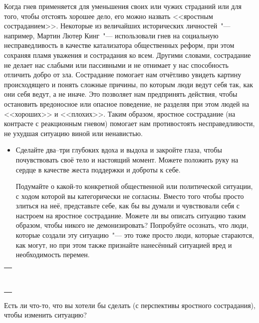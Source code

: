 Когда гнев применяется для уменьшения своих или чужих страданий или для того, чтобы отстоять хорошее дело, его можно назвать <<яростным состраданием>>. Некоторые из величайших исторических личностей~"--- например, Мартин Лютер Кинг~"--- использовали гнев на социальную несправедливость в качестве катализатора общественных реформ, при этом сохраняя пламя уважения и сострадания ко всем. Другими словами, сострадание не делает нас слабыми или пассивными и не отнимает у нас способность отличить добро от зла. Сострадание помогает нам отчётливо увидеть картину происходящего и понять сложные причины, по которым люди ведут себя так, как они себя ведут, а не иначе. Это позволяет нам предпринять действия, чтобы остановить вредоносное или опасное поведение, не разделяя при этом людей на <<хороших>> и <<плохих>>. Таким образом, яростное сострадание (на контрасте с реакционным гневом) помогает нам противостоять несправедливости, не ухудшая ситуацию виной или ненавистью.
\begin{itemize}
	\item Сделайте два--три глубоких вдоха и выдоха и закройте глаза, чтобы почувствовать своё тело и настоящий момент. Можете положить руку на сердце в качестве жеста поддержки и доброты к себе.
	
	\itemWritingHand Подумайте о какой-то конкретной общественной или политической ситуации, с ходом которой вы категорически не согласны. Вместо того чтобы просто злиться на неё, представьте себе, как бы вы думали и чувствовали себя с настроем на яростное сострадание. Можете ли вы описать ситуацию таким образом, чтобы никого не демонизировать? Попробуйте осознать, что люди, которые создали эту ситуацию~"--- это тоже просто люди, которые стараются, как могут, но при этом также признайте нанесённый ситуацией вред и необходимость перемен.
\end{itemize}

\setlength{\extrarowheight}{2mm}
\begin{tabularx}{\textwidth}{X}
	\\
	\arrayrulecolor{gray}\hline\\
	\hline\\
	\hline\\
	\hline\\
	\hline\\
	\hline\\	
	\hline\\
	\hline\\
	\hline\\
\end{tabularx}
\setlength{\extrarowheight}{0mm}
\begin{itemize}
	\itemWritingHand Есть ли что-то, что вы хотели бы сделать (с перспективы яростного сострадания), чтобы изменить ситуацию?
\end{itemize}

